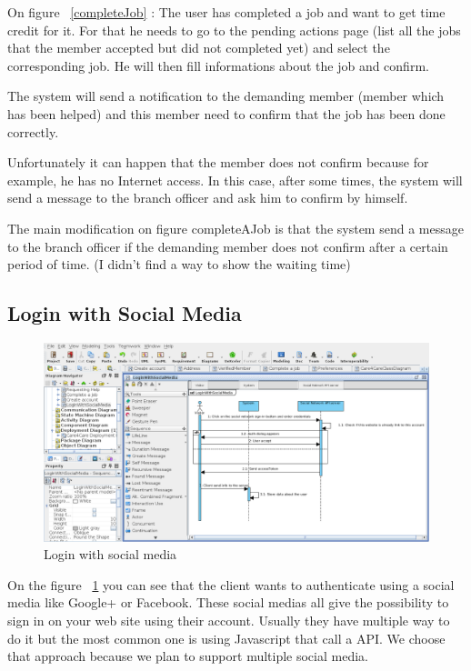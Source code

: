 \documentclass[11pt, a4paper]{article}   	%
\begin{document}
On figure ~\ref{completeJob} : The user has completed a job and want to get time credit for it. For that he needs to go to the pending actions page (list all the jobs that the member accepted but did not completed yet) and select the corresponding job. He will then fill informations about the job and confirm. 

The system will send a notification to the demanding member (member which has been helped) and this member need to confirm that the job has been done correctly.

Unfortunately it can happen that the member does not confirm because for example, he has no Internet access. In this case, after some times, the system will send a message to the branch officer and ask him to confirm by himself.

The main modification on figure {completeAJob} is that the system send a message to the branch officer if the demanding member does not confirm after a certain period of time. (I didn't find a way to show the waiting time)

\subsection{Login with Social Media}

\begin{figure}[!ht]
   \includegraphics[width=\textwidth]{loginWithSocialMedia.png}
   \caption{\label{loginWithSocialMedia} Login with social media}
\end{figure}

On the figure ~\ref{loginWithSocialMedia} you can see that the client wants to authenticate using a social media like Google+ or Facebook. These social medias all give the possibility to sign in on your web site using their account. Usually they have multiple way to do it but the most common one is using Javascript that call a API. We choose that approach because we plan to support multiple social media.
\end{document}
